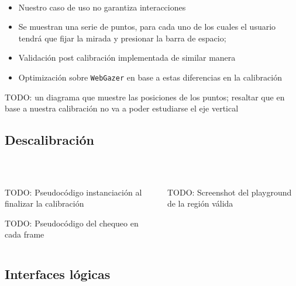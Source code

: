 \documentclass[aspectratio=169]{beamer}
\begin{document}
\begin{frame}{~}
  \begin{itemize}
    \item Nuestro caso de uso no garantiza interacciones

    \item Se muestran una serie de puntos, para cada uno de los cuales el
      usuario tendrá que fijar la mirada y presionar la barra de espacio; 
    
    \item Validación post calibración implementada de similar manera

    \item Optimización sobre \texttt{WebGazer} en base a estas diferencias en
      la calibración
  \end{itemize}

  TODO: un diagrama que muestre las posiciones de los puntos; resaltar que en
  base a nuestra calibración no va a poder estudiarse el eje vertical
\end{frame}

\subsection{Descalibración}

\begin{frame}{~}

  \begin{columns}
    \begin{column}{.5\textwidth}
      TODO: Pseudocódigo instanciación al finalizar la calibración \par
      TODO: Pseudocódigo del chequeo en cada frame
    \end{column}

    \begin{column}{.5\textwidth}
      TODO: Screenshot del playground de la región válida
    \end{column}
  \end{columns}

\end{frame}

\subsection{Interfaces lógicas}
\end{document}
